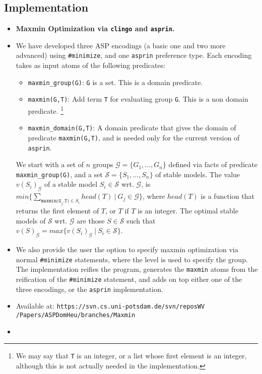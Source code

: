 \documentclass[a4paper,10pt]{article}
\begin{document}
\subsection{Implementation}
\begin{itemize}

\item
\textbf{Maxmin Optimization via \texttt{clingo} and \texttt{asprin}.}
\item
We have developed three ASP encodings (a basic one and two more advanced) using \texttt{\#minimize}, 
and one \texttt{asprin} preference type.
Each encoding takes as input atoms of the following predicates:
\begin{itemize}
  \item
  \texttt{maxmin\_group(G)}: \texttt{G} is a set. This is a domain predicate.
  \item
  \texttt{maxmin(G,T)}: Add term \texttt{T} for evaluating group \texttt{G}. This is a non domain predicate.
  \footnote{We may say that \texttt{T} is an integer, or a list whose first element is an integer,
  although this is not actually needed in the implementation.} 
  \item
  \texttt{maxmin\_domain(G,T)}: A domain predicate that gives the domain of predicate \texttt{maxmin(G,T)}, 
  and is needed only for the current version of \texttt{asprin}.
\end{itemize}
We start with a set of $n$ groups $\mathcal{G}=\{G_1,\ldots,G_n\}$ defined via facts of predicate \texttt{maxmin\_group(G)}, 
and a set $\mathcal{S}=\{S_1,\ldots,S_n\}$ of stable models. 
The value $v(S_i)_\mathcal{G}$ of a stable model $S_i \in \mathcal{S}$ wrt. $\mathcal{G}$, 
is $min \{ \sum_{\texttt{maxmin(G}_\texttt{j}\texttt{,T)} \in S_i}{head(T)} \ | \ G_j \in \mathcal{G} \}$,
where $head(T)$ is a function that returns the first element of $T$, or $T$ if $T$ is an integer.
The optimal stable models of $\mathcal{S}$ wrt. $\mathcal{G}$ 
are those $S \in \mathcal{S}$ such that $v(S)_\mathcal{G}=max \{ v(S_i)_\mathcal{G} \ | \ S_i \in \mathcal{S}\}$. 
\item
We also provide the user the option to specify maxmin optimization via normal \texttt{\#minimize} statements, 
where the level is used to specify the group.
The implementation reifies the program, 
generates the \texttt{maxmin} atoms from the reification of the \texttt{\#minimize} statement, 
and adds on top either one of the three encodings, or the \texttt{asprin} implementation.
\item
Available at: \texttt{https://svn.cs.uni-potsdam.de/svn/reposWV
/Papers/ASPDomHeu/branches/Maxmin}
\item


\end{itemize}
\end{document}
